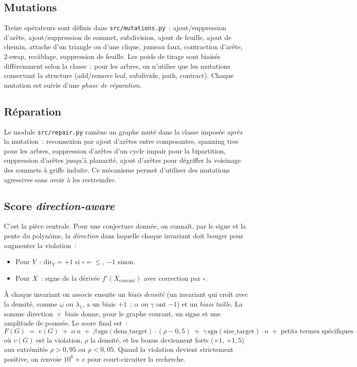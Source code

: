 \documentclass[11pt,a4paper]{article}
\begin{document}
\subsection{Mutations}

Treize opérateurs sont définis dans \texttt{src/mutations.py}~:
ajout/suppression d'arête, ajout/suppression de sommet, subdivision, ajout
de feuille, ajout de chemin, attache d'un triangle ou d'une clique, jumeau
faux, contraction d'arête, 2-swap, recâblage, suppression de feuille. Les
poids de tirage sont biaisés différemment selon la classe~: pour les arbres,
on n'utilise que les mutations conservant la structure (add/remove leaf,
subdivide, path, contract). Chaque mutation est suivie d'une \emph{phase de
réparation}.

\subsection{Réparation}

Le module \texttt{src/repair.py} ramène un graphe muté dans la classe imposée
\emph{après} la mutation~: reconnexion par ajout d'arêtes entre composantes,
spanning tree pour les arbres, suppression d'arêtes d'un cycle impair pour
la bipartition, suppression d'arêtes jusqu'à planarité, ajout d'arêtes pour
\og{}dégriffer\fg{} la voisinage des sommets à griffe induite. Ce mécanisme
permet d'utiliser des mutations agressives sans avoir à les restreindre.

\subsection{Score \emph{direction-aware}}
\label{sec:score}

C'est la pièce centrale. Pour une conjecture donnée, on connaît, par le
signe et la pente du polynôme, la \emph{direction} dans laquelle chaque
invariant doit bouger pour augmenter la violation~:
\begin{itemize}
  \item Pour $Y$~: $\mathrm{dir}_Y = +1$ si $\square = \le$, $-1$ sinon.
  \item Pour $X$~: signe de la dérivée
    $f'(X_{\text{courant}})$ avec correction par $\square$.
\end{itemize}

À chaque invariant on associe ensuite un \emph{biais densité} (un invariant
qui croît avec la densité, comme $\omega$ ou $\lambda_1$, a un biais $+1$~;
$\alpha$ ou $\gamma$ ont $-1$) et un \emph{biais taille}. La somme
direction~$\times$~biais donne, pour le graphe courant, un signe et une
amplitude de poussée. Le score final est~:
{\small
\[
  F(G) \;=\; v(G) \;+\; \alpha\, n
  \;+\; \beta\,\mathrm{sgn}(\mathrm{dens\_target}) \cdot (\rho - 0{,}5)
  \;+\; \gamma\,\mathrm{sgn}(\mathrm{size\_target}) \cdot n
  \;+\; \text{petits termes spécifiques}
\]}
où $v(G)$ est la violation, $\rho$ la densité, et les bonus deviennent forts
($+1$, $+1{,}5$) aux extrémités $\rho > 0{,}95$ ou $\rho < 0{,}05$. Quand la
violation devient strictement positive, on renvoie $10^6 + v$ pour court-circuiter
la recherche.
\end{document}
